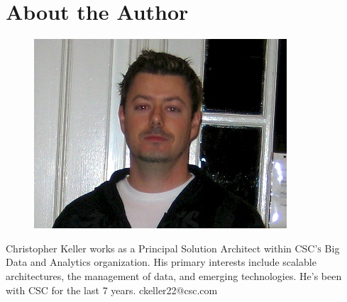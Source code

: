 \section*{About the Author}
\begin{figure}
    \vspace{-15pt}
        \includegraphics[scale=0.4]{headshot}
    \vspace{-15pt}
\end{figure} Christopher Keller works as a Principal Solution Architect within \textsc{CSC's} Big Data and Analytics organization. His primary interests include scalable architectures, the management of data, and emerging technologies. He's been with \textsc{CSC} for the last 7 years. ckeller22@csc.com
